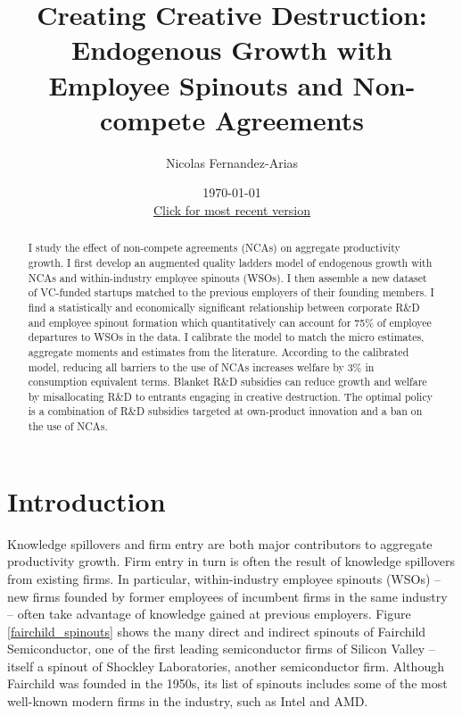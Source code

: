 \documentclass[11pt,english]{article}
\begin{document}
	
\title{Creating Creative Destruction: Endogenous Growth with Employee Spinouts and Non-compete Agreements}

\author{Nicolas Fernandez-Arias} 
\date{\today \\ \small
	\href{https://drive.google.com/file/d/1gu4CT1ft4LY4MsKKgluxb8Gu_YoP8DLD/view?usp=sharing}{Click for most recent version}}
\maketitle



\begin{abstract}
	I study the effect of non-compete agreements (NCAs) on aggregate productivity growth. I first develop an augmented quality ladders model of endogenous growth with NCAs and within-industry employee spinouts (WSOs). I then assemble a new dataset of VC-funded startups matched to the previous employers of their founding members. I find a statistically and economically significant relationship between corporate R\&D and employee spinout formation which quantitatively can account for 75\% of employee departures to WSOs in the data. I calibrate the model to match the micro estimates, aggregate moments and estimates from the literature. According to the calibrated model, reducing all barriers to the use of NCAs increases welfare by 3\% in consumption equivalent terms. Blanket R\&D subsidies can reduce growth and welfare by misallocating R\&D to entrants engaging in creative destruction. The optimal policy is a combination of R\&D subsidies targeted at own-product innovation and a ban on the use of NCAs.
\end{abstract}

\section{Introduction}

Knowledge spillovers and firm entry are both major contributors to aggregate productivity growth. Firm entry in turn is often the result of knowledge spillovers from existing firms. In particular, within-industry employee spinouts (WSOs) -- new firms founded by former employees of incumbent firms in the same industry -- often take advantage of knowledge gained at previous employers. Figure \ref{fairchild_spinouts} shows the many direct and indirect spinouts of Fairchild Semiconductor, one of the first leading semiconductor firms of Silicon Valley -- itself a spinout of Shockley Laboratories, another semiconductor firm. Although Fairchild was founded in the 1950s, its list of spinouts includes some of the most well-known modern firms in the industry, such as Intel and AMD. 
\end{document}
